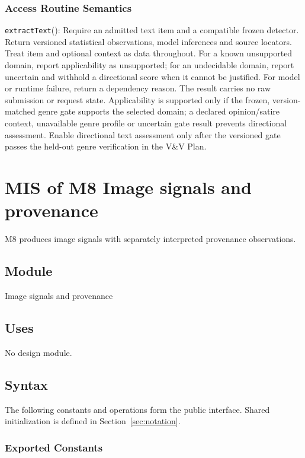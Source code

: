 \documentclass[12pt, titlepage]{article}
\begin{document}
\subsubsection{Access Routine Semantics}

\noindent \texttt{extractText}():
Require an admitted text item and a compatible frozen detector. Return versioned statistical observations, model inferences and source locators. Treat item and optional context as data throughout. For a known unsupported domain, report applicability as unsupported; for an undecidable domain, report uncertain and withhold a directional score when it cannot be justified. For model or runtime failure, return a dependency reason. The result carries no raw submission or request state. Applicability is supported only if the frozen, version-matched genre gate supports the selected domain; a declared opinion/satire context, unavailable genre profile or uncertain gate result prevents directional assessment. Enable directional text assessment only after the versioned gate passes the held-out genre verification in the V\&V Plan.

\clearpage
\section{MIS of M8 Image signals and provenance} \label{sec:m8}

M8 produces image signals with separately interpreted provenance observations.

\subsection{Module}

Image signals and provenance

\subsection{Uses}

No design module.

\subsection{Syntax}

The following constants and operations form the public interface. Shared initialization is defined in Section~\ref{sec:notation}.

\subsubsection{Exported Constants}
\end{document}
